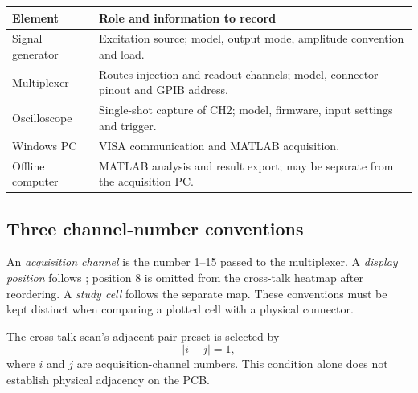 \begin{tabularx}{\linewidth}{@{}lX@{}}
\toprule
Element & Role and information to record \\
\midrule
Signal generator & Excitation source; model, output mode, amplitude convention and load. \\
Multiplexer & Routes injection and readout channels; model, connector pinout and GPIB address. \\
Oscilloscope & Single-shot capture of CH2; model, firmware, input settings and trigger. \\
Windows PC & VISA communication and MATLAB acquisition. \\
Offline computer & MATLAB analysis and result export; may be separate from the acquisition PC. \\
\bottomrule
\end{tabularx}

\subsection{Three channel-number conventions}
\label{sec:channel-conventions}
An \emph{acquisition channel} is the number 1--15 passed to the multiplexer. A \emph{display position} follows ; position 8 is omitted from the cross-talk heatmap after reordering. A \emph{study cell} follows the separate  map. These conventions must be kept distinct when comparing a plotted cell with a physical connector.

The cross-talk scan's adjacent-pair preset is selected by
\[
 |i-j|=1,
\]
where $i$ and $j$ are acquisition-channel numbers. This condition alone does not establish physical adjacency on the PCB.

